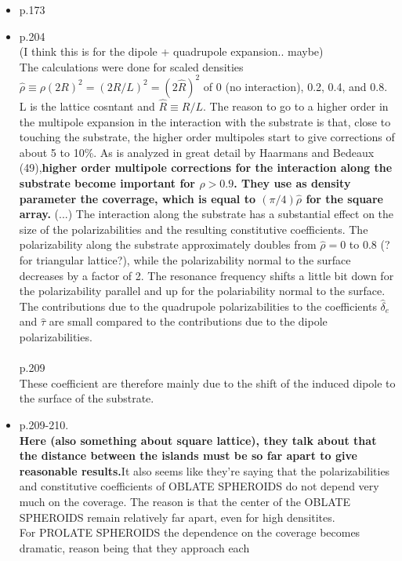 \begin{itemize}
\item p.173

\item p.204\\
   (I think this is for the dipole + quadrupole expansion.. maybe) \\
   The calculations were done for scaled densities $\hat \rho \equiv \rho(2R)^2 = (2R/L)^2 = (2\hat R)^2$ of
   0 (no interaction), 0.2, 0.4, and 0.8. L is the lattice cosntant and $\hat R \equiv R/L$. The reason
   to go to a higher order in the multipole expansion in the interaction with the substrate is that,
   close to touching the substrate, the higher order multipoles start to give corrections of about 5 to 10\%.
   As is analyzed in great detail by Haarmans and Bedeaux (49),\textbf{higher order multipole corrections 
   for the interaction along the substrate become important for $\hat \rho > 0.9$. They use as density
   parameter the coverrage, which is equal to $(\pi/4)\hat \rho$ for the square array.}
   (...) The interaction along the substrate has a substantial effect on the size of the polarizabilities and 
   the resulting constitutive coefficients. The polarizability along the substrate approximately doubles 
   from $\hat \rho = 0$ to 0.8 (?for triangular lattice?), while the polarizability normal to the surface
   decreases by a factor of 2. The resonance frequency shifts a little bit down for the polarizability
   parallel and up for the polariability normal to the surface. The contributions due to the 
   quadrupole polarizabilities to the coefficients $\hat \delta_e$ and $\hat \tau$ are small compared to
   the contributions due to the dipole polarizabilities. \\
   \\
   p.209\\
   These coefficient are therefore mainly due to the shift of the induced dipole to the surface of 
   the substrate.
\item p.209-210.\\
   \textbf{Here (also something about square lattice), they talk about that the distance between the
   islands must be so far apart to give reasonable results.}It also seems like they're saying that
the polarizabilities and constitutive coefficients of OBLATE SPHEROIDS do not depend very much on the
coverage. The reason is that the center of the OBLATE SPHEROIDS remain relatively far apart, even for high
densitites. \\
For PROLATE SPHEROIDS the dependence on the coverage becomes dramatic, reason being that they approach each

\end{itemize}
